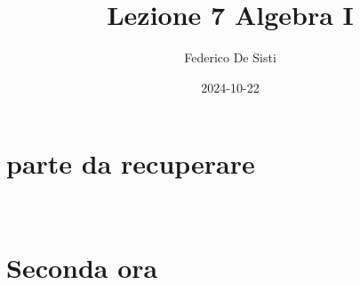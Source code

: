 \documentclass[12px]{article}
\title{Lezione 7 Algebra I}
\date{2024-10-22}
\author{Federico De Sisti}
\begin{document}
	\maketitle
	\newpage
	\section{parte da recuperare}\\
	\section{Seconda ora}\\
	
	
\end{document}
